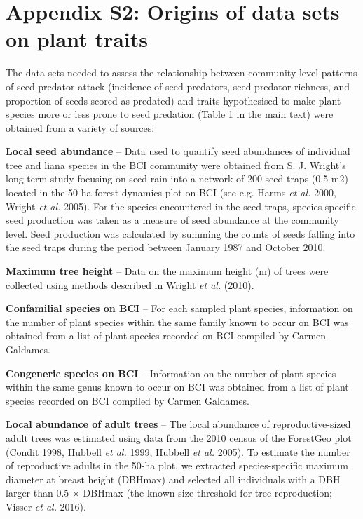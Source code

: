 \documentclass[11pt]{article}
\begin{document}
\newpage

\section{Appendix S2: Origins of data sets on plant traits}

The data sets needed to assess the relationship between community-level patterns of seed predator attack (incidence of seed predators, seed predator richness, and proportion of seeds scored as predated) and traits hypothesised to make plant species more or less prone to seed predation (Table 1 in the main text) were obtained from a variety of sources:
 
\textbf{Local seed abundance} – Data used to quantify seed abundances of individual tree and liana species in the BCI community were obtained from S. J. Wright’s long term study focusing on seed rain into a network of 200 seed traps (0.5 m2) located in the 50-ha forest dynamics plot on BCI (see e.g. Harms \emph{et al. }2000, Wright \emph{et al. }2005). For the species encountered in the seed traps, species-specific seed production was taken as a measure of seed abundance at the community level. Seed production was calculated by summing the counts of seeds falling into the seed traps during the period between January 1987 and October 2010.

\textbf{Maximum tree height} – Data on the maximum height (m) of trees were collected using methods described in Wright \emph{et al. }(2010).

\textbf{Confamilial species on BCI} – For each sampled plant species, information on the number of plant species within the same family known to occur on BCI was obtained from a list of plant species recorded on BCI compiled by Carmen Galdames.

\textbf{Congeneric species on BCI} – Information on the number of plant species within the same genus known to occur on BCI was obtained from a list of plant species recorded on BCI compiled by Carmen Galdames.

\textbf{Local abundance of adult trees }– The local abundance of reproductive-sized adult trees was estimated using data from the 2010 census of the ForestGeo plot (Condit 1998, Hubbell \emph{et al. }1999, Hubbell \emph{et al. }2005). To estimate the number of reproductive adults in the 50-ha plot, we extracted species-specific maximum diameter at breast height (DBHmax) and selected all individuals with a DBH larger than 0.5 $\times$ DBHmax (the known size threshold for tree reproduction; Visser \emph{et al. }2016).
\end{document}
